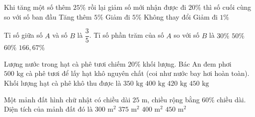\begin{ex} %
Khi tăng một số thêm $25\%$ rồi lại giảm số mới nhận được đi $20\%$ thì số cuối cùng so với số ban đầu
\choice
{Tăng thêm $5\%$}
{Giảm đi $5\%$}
{\True Không thay đổi}
{Giảm đi $1\%$}
\end{ex}

\begin{ex} %
Tỉ số giữa số $A$ và số $B$ là $\dfrac{3}{5}$. Tỉ số phần trăm của số $A$ so với số $B$ là
\choice
{$30\%$}
{$50\%$}
{\True $60\%$}
{$166{,}67\%$}
\end{ex}

\begin{ex} %
Lượng nước trong hạt cà phê tươi chiếm $20\%$ khối lượng. Bác An đem phơi $500\text{ kg}$ cà phê tươi để lấy hạt khô nguyên chất (coi như nước bay hơi hoàn toàn). Khối lượng hạt cà phê khô thu được là
\choice
{$350\text{ kg}$}
{\True $400\text{ kg}$}
{$420\text{ kg}$}
{$450\text{ kg}$}
\end{ex}

\begin{ex} %
Một mảnh đất hình chữ nhật có chiều dài $25\text{ m}$, chiều rộng bằng $60\%$ chiều dài. Diện tích của mảnh đất đó là
\choice
{$300\text{ m}^2$}
{\True $375\text{ m}^2$}
{$400\text{ m}^2$}
{$450\text{ m}^2$}
\end{ex}

